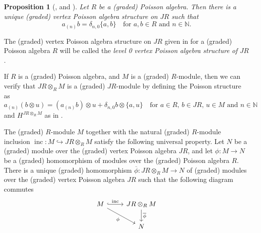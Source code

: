 \documentclass[a4paper, 12pt, reqno]{amsart}
\newtheorem{proposition}[theorem]{Proposition}
\theoremstyle{remark}
\DeclareMathOperator{\inc}{inc}
\begin{document}
\begin{proposition}[{\cite{arakawa_associated_2015}, \cite[Proposition 2.3.1]{arakawa_remark_2012} and }]
  \label{prp:7}
  Let $R$ be a (graded) Poisson algebra.
  Then there is a unique (graded) vertex Poisson algebra structure on $JR$ such that
  \begin{equation*}
    a_{(n)}b = \delta_{n, 0}\{a, b\} \quad \text{for $a, b \in R$ and $n \in \mathbb{N}$}.
  \end{equation*}
\end{proposition}

The (graded) vertex Poisson algebra structure on $JR$ given in  for a (graded) Poisson algebra $R$ will be called the \emph{level 0 vertex Poisson algebra structure of $JR$}.

If $R$ is a (graded) Poisson algebra, and $M$ is a (graded) $R$-module, then we can verify that $JR \otimes_R M$ is a (graded) $JR$-module by defining the Poisson structure as
\begin{equation*}
  a_{(n)}(b\otimes u) = (a_{(n)}b)\otimes u + \delta_{n, 0}b\otimes\{a, u\} \quad \text{for $a \in R$, $b \in JR$, $u \in M$ and $n \in \mathbb{N}$}
\end{equation*}
and $H^{JR \otimes_R M}$ as in .

The (graded) $R$-module $M$ together with the natural (graded) $R$-module inclusion $\inc: M \hookrightarrow JR \otimes_R M$ satisfy the following universal property.
Let $N$ be a (graded) module over the (graded) vertex Poisson algebra $JR$, and let $\phi: M \to N$ be a (graded) homomorphism of modules over the (graded) Poisson algebra $R$.
There is a unique (graded) homomorphism $\overline{\phi}: JR \otimes_R M \to N$ of (graded) modules over the (graded) vertex Poisson algebra $JR$ such that the following diagram commutes
\begin{equation*}
  \begin{tikzcd}
    M \arrow[r, "\inc", hook] \arrow[rd, "\phi"'] & JR \otimes_R M \arrow[d, "\overline{\phi}"] \\
    & N
  \end{tikzcd}
\end{equation*}



\end{document}
